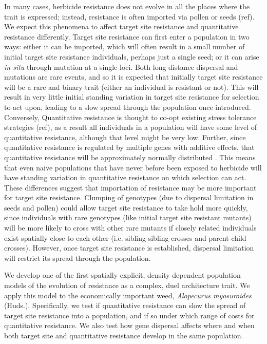 \documentclass[10pt,letterpaper]{article}
\begin{document}
In many cases, herbicide resistance does not evolve in all the places where the trait is expressed; instead, resistance is often imported via pollen or seeds (ref). We expect this phenomena to affect target site resistance and quantitative resistance differently. Target site resistance can first enter a population in two ways: either it can be imported, which will often result in a small number of initial target site resistance individuals, perhaps just a single seed; or it can arise \textit{in situ} through mutation at a single loci. Both long distance dispersal and mutations are rare events, and so it is expected that initially target site resistance will be a rare and binary trait (either an individual is resistant or not). This will result in very little initial standing variation in target site resistance for selection to act upon, leading to a slow spread through the population once introduced. Conversely, Quantitative resistance is thought to co-opt existing stress tolerance strategies (ref), as a result all individuals in a population will have some level of quantitative resistance, although that level might be very low. Further, since quantitative resistance is regulated by multiple genes with additive effects, that quantitative resistance will be approximately normally distributed \cite{Land1989, Mack2009, Rajo2013}. This means that even naive populations that have never before been exposed to herbicide will have standing variation in quantitative resistance on which selection can act. These differences suggest that importation of resistance may be more important for target site resistance. Clumping of genotypes (due to dispersal limitation in seeds and pollen) could allow target site resistance to take hold more quickly, since individuals with rare genotypes (like initial target site resistant mutants) will be more likely to cross with other rare mutants if closely related individuals exist spatially close to each other (i.e. sibling-sibling crosses and parent-child crosses). However, once target site resistance is established, dispersal limitation will restrict its spread through the population. 

We develop one of the first spatially explicit, density dependent population models of the evolution of resistance as a complex, duel architecture trait. We apply this model to the economically important weed, \textit{Alopecurus myosuroides} (Huds.). Specifically, we test if quantitative resistance can slow the spread of target site resistance into a population, and if so under which range of costs for quantitative resistance. We also test how gene dispersal affects where and when both target site and quantitative resistance develop in the same population. 
\end{document}
